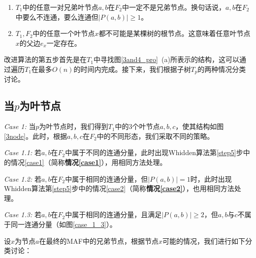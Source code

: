 \begin{enumerate}
	\item $T_1$中的任意一对兄弟叶节点$a,b$在$F_2$中一定不是兄弟节点。换句话说，$a,b$在$F_2$中要么不连通，要么连通但$|P(a,b)| \ge 1$。
	\item \label{2point} $T_1,F_2$中的任意一个叶节点$x$都不可能是某棵树的根节点。这意味着任意叶节点$x$的父边$e_x$一定存在。
\end{enumerate}

改进算法的第五步首先是在$T_1$中寻找图\ref{3and4_pro}~(a)所表示的结构，这可以通过遍历$T_1$在最多$O(n)$的时间内完成。接下来，我们根据子树$T_p$的两种情况分类讨论。

\subsection{当$p$为叶节点}
\textit{Case 1: }当$p$为叶节点时，我们得到$T_1$中的$3$个叶节点$a,b,c$，使其结构如图\ref{3node}。此时，根据$a,b,c$在$F_2$中的不同形态，我们采取不同的策略。

\textit{Case 1.1: }若$a,b$在$F_2$中属于不同的连通分量，此时出现Whidden算法第\ref{step5}步中的情况\ref{case1}（简称\textbf{情况\ref{case1}}），用相同方法处理。

\textit{Case 1.2: }若$a,b$在$F_2$中属于相同的连通分量，但$|P(a,b)|=1$时，此时出现Whidden算法第\ref{step5}步中的情况\ref{case2}（简称\textbf{情况\ref{case2}}），也用相同方法处理。

\textit{Case 1.3: }若$a,b$在$F_2$中属于相同的连通分量，且满足$|P(a,b)| \ge 2$，但$a,b$与$c$不属于同一连通分量（如图\ref{case_1_3}）。

设$x$为节点$a$在最终的MAF中的兄弟节点，根据节点$x$可能的情况，我们进行如下分类讨论：

